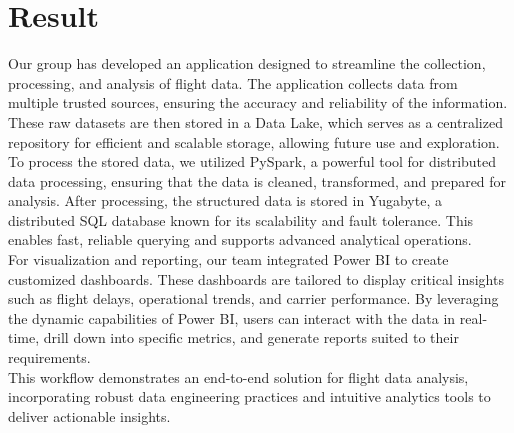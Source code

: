 \documentclass[12pt,a4paper]{article}
\begin{document}
\section{Result}
Our group has developed an application designed to streamline the collection,
processing, and analysis of flight data. The application collects data from
multiple trusted sources, ensuring the accuracy and reliability of the
information. These raw datasets are then stored in a Data Lake, which serves as
a centralized repository for efficient and scalable storage, allowing future use
and exploration.\\
To process the stored data, we utilized PySpark, a powerful tool for distributed
data processing, ensuring that the data is cleaned, transformed, and prepared
for analysis. After processing, the structured data is stored in Yugabyte, a
distributed SQL database known for its scalability and fault tolerance. This
enables fast, reliable querying and supports advanced analytical operations.\\
For visualization and reporting, our team integrated Power BI to create
customized dashboards. These dashboards are tailored to display critical
insights such as flight delays, operational trends, and carrier performance. By
leveraging the dynamic capabilities of Power BI, users can interact with the
data in real-time, drill down into specific metrics, and generate reports suited
to their requirements.\\
This workflow demonstrates an end-to-end solution for flight data analysis,
incorporating robust data engineering practices and intuitive analytics tools to
deliver actionable insights.\\
\end{document}
